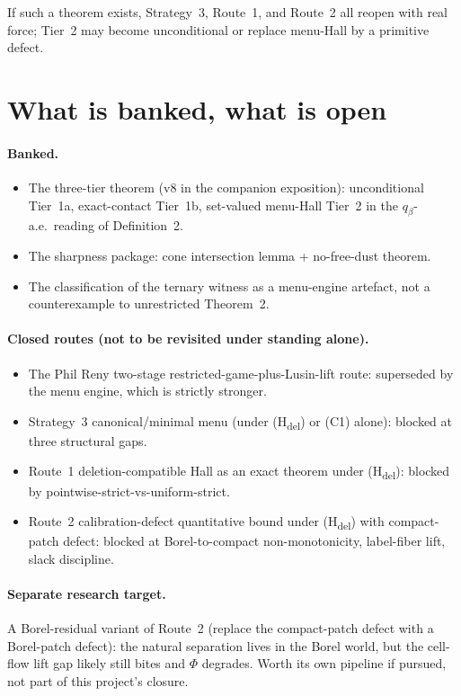 \documentclass[11pt]{article}
\theoremstyle{definition}
\theoremstyle{remark}
\begin{document}
If such a theorem exists, Strategy~3, Route~1, and Route~2 all
reopen with real force; Tier~2 may become unconditional or replace
menu-Hall by a primitive defect.

\section{What is banked, what is open}\label{sec:status}

\paragraph{Banked.}
\begin{itemize}[leftmargin=2em]
\item The three-tier theorem (v8 in the companion exposition):
unconditional Tier~1a, exact-contact Tier~1b, set-valued menu-Hall
Tier~2 in the $q_\beta$-a.e.\ reading of Definition~2.
\item The sharpness package: cone intersection lemma + no-free-dust
theorem.
\item The classification of the ternary witness as a menu-engine
artefact, not a counterexample to unrestricted Theorem~2.
\end{itemize}

\paragraph{Closed routes (not to be revisited under standing alone).}
\begin{itemize}[leftmargin=2em]
\item The Phil Reny two-stage restricted-game-plus-Lusin-lift route:
superseded by the menu engine, which is strictly stronger.
\item Strategy~3 canonical/minimal menu (under (H\textsubscript{del})
or (C1) alone): blocked at three structural gaps.
\item Route~1 deletion-compatible Hall as an exact theorem under
(H\textsubscript{del}): blocked by pointwise-strict-vs-uniform-strict.
\item Route~2 calibration-defect quantitative bound under
(H\textsubscript{del}) with compact-patch defect: blocked at
Borel-to-compact non-monotonicity, label-fiber lift, slack discipline.
\end{itemize}

\paragraph{Separate research target.}
A Borel-residual variant of Route~2 (replace the compact-patch
defect with a Borel-patch defect): the natural separation lives in
the Borel world, but the cell-flow lift gap likely still bites and
$\Phi$ degrades. Worth its own pipeline if pursued, not part of this
project's closure.
\end{document}
